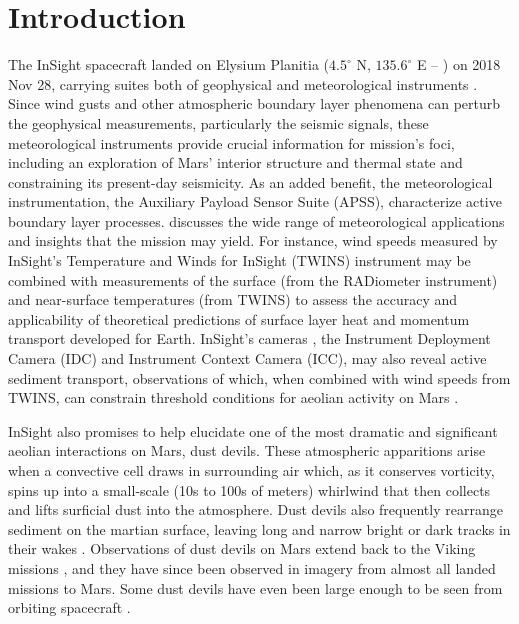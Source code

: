 \documentclass{aastex63}
\begin{document}

\section{Introduction} \label{sec:Introduction}
The InSight spacecraft landed on Elysium Planitia ($4.5^\circ$ N, $135.6^\circ$ E -- \citealp{2020E&SS....701248G}) on 2018 Nov 28, carrying suites both of geophysical \citep{2020NatGe..13..183B} and meteorological instruments \citep{Banfield2019,2020NatGe..13..190B}. Since wind gusts and other atmospheric boundary layer phenomena can perturb the geophysical measurements, particularly the seismic signals, these meteorological instruments provide crucial information for mission's foci, including an exploration of Mars' interior structure and thermal state and constraining its present-day seismicity. As an added benefit, the meteorological instrumentation, the Auxiliary Payload Sensor Suite (APSS), characterize active boundary layer processes. \citet{2018SSRv..214..109S} discusses the wide range of meteorological applications and insights that the mission may yield. For instance, wind speeds measured by InSight's Temperature and Winds for InSight (TWINS) instrument may be combined with measurements of the surface (from the RADiometer instrument) and near-surface temperatures (from TWINS) to assess the accuracy and applicability of theoretical predictions of surface layer heat and momentum transport developed for Earth. InSight's cameras \citep{2018SSRv..214..105M}, the Instrument Deployment Camera (IDC) and Instrument Context Camera (ICC), may also reveal active sediment transport, observations of which, when combined with wind speeds from TWINS, can constrain threshold conditions for aeolian activity on Mars \citep{2012Natur.485..339B}.

InSight also promises to help elucidate one of the most dramatic and significant aeolian interactions on Mars, dust devils. These atmospheric apparitions arise when a convective cell draws in surrounding air which, as it conserves vorticity, spins up into a small-scale (10s to 100s of meters) whirlwind that then collects and lifts surficial dust into the atmosphere. Dust devils also frequently rearrange sediment on the martian surface, leaving long and narrow bright or dark tracks in their wakes \citep{2016SSRv..203..143R}. Observations of dust devils on Mars extend back to the Viking missions \citep{1985Sci...230..175T}, and they have since been observed in imagery from almost all landed missions to Mars. Some dust devils have even been large enough to be seen from orbiting spacecraft \citep[\emph{e.g.},][]{2011GeoRL..3824206C}.
\end{document}
